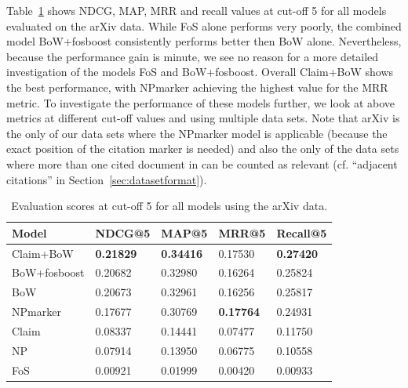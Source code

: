 Table~\ref{tab:arxivevalnumbers} shows NDCG, MAP, MRR and recall values at cut-off 5 for all models evaluated on the arXiv data. While FoS alone performs very poorly, the combined model BoW+fosboost consistently performs better then BoW alone. Nevertheless, because the performance gain is minute, we see no reason for a more detailed investigation of the models FoS and BoW+fosboost. Overall Claim+BoW shows the best performance, with NPmarker achieving the highest value for the MRR metric. To investigate the performance of these models further, we look at above metrics at different cut-off values and using multiple data sets. Note that arXiv is the only of our data sets where the NPmarker model is applicable (because the exact position of the citation marker is needed) and also the only of the data sets where more than one cited document in can be counted as relevant (cf. ``adjacent citations'' in Section~\ref{sec:datasetformat}).




\begin{table}[]
\centering
    \caption{Evaluation scores at cut-off 5 for all models using the arXiv data.}
    \label{tab:arxivevalnumbers}
\begin{center}
    \begin{tabular}{lllll}
    \toprule
    Model & NDCG@5 & MAP@5 & MRR@5 & Recall@5 \\
    \midrule
    Claim+BoW & \textbf{0.21829} & \textbf{0.34416} & 0.17530 & \textbf{0.27420} \\
    BoW+fosboost   & 0.20682 & 0.32980 & 0.16264 & 0.25824 \\
    BoW       & 0.20673 & 0.32961 & 0.16256 & 0.25817 \\
    NPmarker  & 0.17677 & 0.30769 & \textbf{0.17764} & 0.24931 \\
    Claim     & 0.08337 & 0.14441 & 0.07477 & 0.11750 \\
    NP        & 0.07914 & 0.13950 & 0.06775 & 0.10558 \\
    FoS       & 0.00921 & 0.01999 & 0.00420 & 0.00933 \\
    \bottomrule
    \end{tabular}
\end{center}
\end{table}

